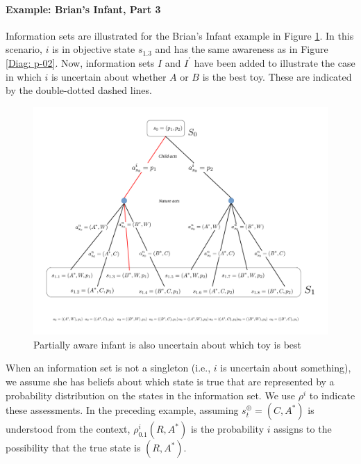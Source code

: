 \documentclass[
11pt,
titlepage,
reqno,
]{article}%
\theoremstyle{definition}
\begin{document}
\paragraph{Example: Brian's Infant, Part 3}	Information sets are illustrated for the Brian's Infant example in Figure \ref{Diag: p-03}. 
In this scenario, $i$ is in objective state $s_{1.3}$ and has the same awareness as in Figure \ref{Diag: p-02}. 
Now, information sets $I$ and $I^\prime$ have been added to illustrate the case in which $i$ is uncertain about whether $A$ or $B$ is the best toy.
These are indicated by the double-dotted dashed lines. 
	
\begin{figure}[h!]
	\centering
	\includegraphics*[page=3,trim = 0in 6in 6.5in 0in,scale=.8]{Awareness_Diagrams_All}
	\caption{Partially aware infant is also uncertain about which toy is best\label{Diag: p-03}}%
\end{figure}
	
When an information set is not a singleton (i.e., $i$ is uncertain about something), we assume she has beliefs about which state is true that are represented by a probability distribution on the states in the information set. 
We use $\rho^i$ to indicate these assessments. 
In the preceding example, assuming $s^\oplus_t=(C,A^\ast)$ is understood from the context, $\rho^i_{0.1}(R,A^\ast)$ is the probability $i$ assigns to the possibility that the true state is $(R,A^\ast)$.
	
\end{document}
